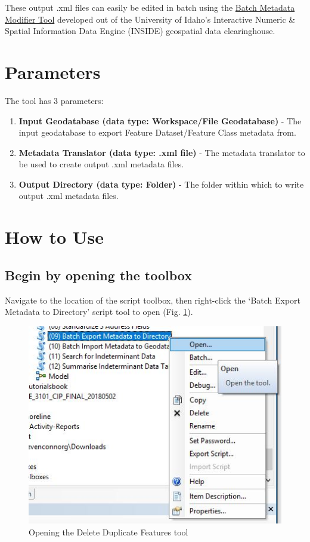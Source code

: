 \documentclass[openany]{book}
\theoremstyle{definition}
\theoremstyle{definition}
\theoremstyle{definition}
\theoremstyle{remark}
\begin{document}
These output .xml files can easily be edited in batch using the
\href{http://insideidaho.org/helpdocs/batch_metadata_modifier_tool.html}{Batch
Metadata Modifier Tool} developed out of the University of Idaho's
Interactive Numeric \& Spatial Information Data Engine (INSIDE)
geospatial data clearinghouse.

\section{Parameters}\label{parameters-10}

The tool has 3 parameters:

\begin{enumerate}
\def\labelenumi{\arabic{enumi}.}
\item
  \textbf{Input Geodatabase (data type: Workspace/File Geodatabase)} -
  The input geodatabase to export Feature Dataset/Feature Class metadata
  from.
\item
  \textbf{Metadata Translator (data type: .xml file)} - The metadata
  translator to be used to create output .xml metadata files.
\item
  \textbf{Output Directory (data type: Folder)} - The folder within
  which to write output .xml metadata files.
\end{enumerate}

\section{How to Use}\label{how-to-use-10}

\subsection{Begin by opening the
toolbox}\label{begin-by-opening-the-toolbox-10}

Navigate to the location of the script toolbox, then right-click the
`Batch Export Metadata to Directory' script tool to open (Fig.
\ref{fig:exMetaopen}).

\begin{figure}[H]

{\centering \includegraphics{figures/exMeta-open} 

}

\caption{Opening the Delete Duplicate Features tool}\label{fig:exMetaopen}
\end{figure}
\end{document}
